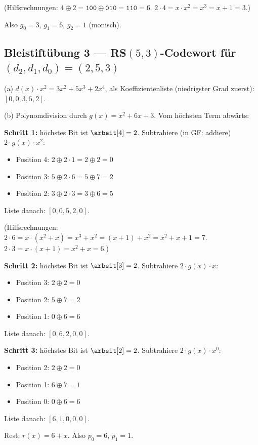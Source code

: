 (Hilfsrechnungen: $4 \oplus 2 = \texttt{100} \oplus \texttt{010} =
\texttt{110} = 6$. $2 \cdot 4 = x \cdot x^2 = x^3 = x + 1 = 3$.)

Also $g_0 = 3$, $g_1 = 6$, $g_2 = 1$ (monisch).

\subsection*{Bleistiftübung 3 — RS$(5,3)$-Codewort für $(d_2, d_1, d_0) = (2, 5, 3)$}

(a) $d(x) \cdot x^2 = 3 x^2 + 5 x^3 + 2 x^4$, als Koeffizientenliste
(niedrigster Grad zuerst): $[0, 0, 3, 5, 2]$.

(b) Polynomdivision durch $g(x) = x^2 + 6x + 3$. Vom höchsten Term
abwärts:

\textbf{Schritt 1:} höchstes Bit ist $\arbeit[4] = 2$. Subtrahiere
(in GF: addiere) $2 \cdot g(x) \cdot x^2$:
\begin{itemize}
\item Position 4: $2 \oplus 2 \cdot 1 = 2 \oplus 2 = 0$
\item Position 3: $5 \oplus 2 \cdot 6 = 5 \oplus 7 = 2$
\item Position 2: $3 \oplus 2 \cdot 3 = 3 \oplus 6 = 5$
\end{itemize}
Liste danach: $[0, 0, 5, 2, 0]$.

(Hilfsrechnungen: $2 \cdot 6 = x \cdot (x^2 + x) = x^3 + x^2 =
(x+1) + x^2 = x^2 + x + 1 = 7$. $2 \cdot 3 = x \cdot (x+1) = x^2 + x
= 6$.)

\textbf{Schritt 2:} höchstes Bit ist $\arbeit[3] = 2$. Subtrahiere
$2 \cdot g(x) \cdot x$:
\begin{itemize}
\item Position 3: $2 \oplus 2 = 0$
\item Position 2: $5 \oplus 7 = 2$
\item Position 1: $0 \oplus 6 = 6$
\end{itemize}
Liste danach: $[0, 6, 2, 0, 0]$.

\textbf{Schritt 3:} höchstes Bit ist $\arbeit[2] = 2$. Subtrahiere
$2 \cdot g(x) \cdot x^0$:
\begin{itemize}
\item Position 2: $2 \oplus 2 = 0$
\item Position 1: $6 \oplus 7 = 1$
\item Position 0: $0 \oplus 6 = 6$
\end{itemize}
Liste danach: $[6, 1, 0, 0, 0]$.

Rest: $r(x) = 6 + x$. Also $p_0 = 6$, $p_1 = 1$.

